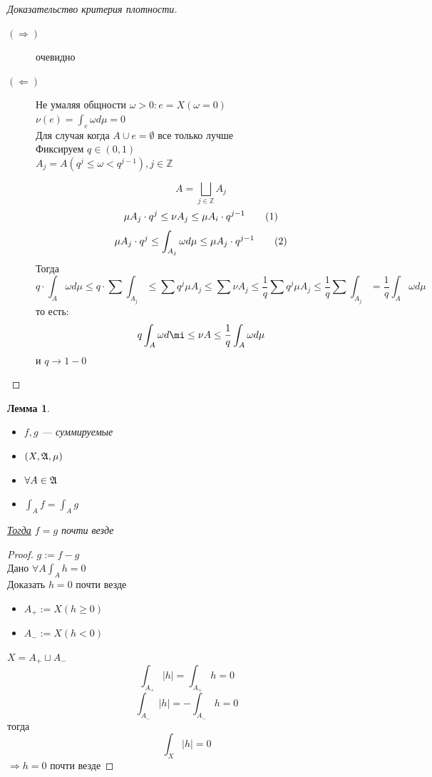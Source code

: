 \documentclass[russ,oneside]{book}
\newcommand\addtag{\refstepcounter{equation}\tag{\theequation}}
\theoremstyle{plain}
\newtheorem{lemma}{Лемма}
\theoremstyle{remark}
\theoremstyle{definition}
\begin{document}
\begin{proof}[Доказательство критерия плотности]
\begin{description}
\item[{\((\Rightarrow)\)}] очевидно
\item[{\((\Leftarrow)\)}] Не умаляя общности \(\omega > 0: e = X(\omega = 0)\) \\
\(\nu(e) = \int_e \omega d\mu = 0\) \\
Для случая когда \(A \cup e = \emptyset\) все только лучше \\
Фиксируем \(q \in (0, 1)\) \\
\(A_j = A(q^j \le \omega < q^{j - 1}), j \in \mathbb{Z}\) \\
\begin{center}
\end{center}
\[ A = \bigsqcup_{j \in \mathbb{Z}} A_j \]
\[ \mu A_j \cdot q^{j} \le \nu A_j \le \mu A_i \cdot q^{j - 1} \addtag\label{5_1_neq}\]
\[ \mu A_j \cdot q^j \le \int_{A_j} \omega d\mu \le \mu A_j \cdot q^{j - 1} \addtag\label{5_2_neq} \]
Тогда
\[ q \cdot \int_A \omega d\mu \le q \cdot \sum \int_{A_j} \le \sum q^j \mu A_j \le \sum \nu A_j \le \frac{1}{q} \sum q^j \mu A_j \le \frac{1}{q} \sum \int_{A_j} = \frac{1}{q} \int_A \omega d\mu \ \]
то есть:
\[ q \int_A \omega d\mi \le \nu A \le \frac{1}{q} \int_A \omega d\mu \]
и \(q \to 1 - 0\)
\end{description}
\end{proof}
\begin{lemma}
\-
\begin{itemize}
\item \(f, g\) --- суммируемые
\item \((X, \mathfrak{A}, \mu)\)
\item \(\forall A \in \mathfrak{A}\)
\item \(\int_A f = \int_A g\)
\end{itemize}
\uline{Тогда} \(f = g\) почти везде
\end{lemma}
\begin{proof}
\(g := f - g\) \\
Дано \(\forall A \int_A h = 0\) \\
Доказать \(h = 0\) почти везде \\
\begin{itemize}
\item \(A_{+} := X(h \ge 0)\)
\item \(A_{-} := X(h < 0)\)
\end{itemize}
\(X = A_+ \sqcup A_-\)
\[ \int_{A_+} |h| = \int_{A_+} h = 0 \]
\[ \int_{A_-} |h| = -\int_{A_-} h = 0 \]
тогда \[ \int_X |h| = 0 \]
\(\Rightarrow h = 0\) почти везде
\end{proof}
\end{document}

